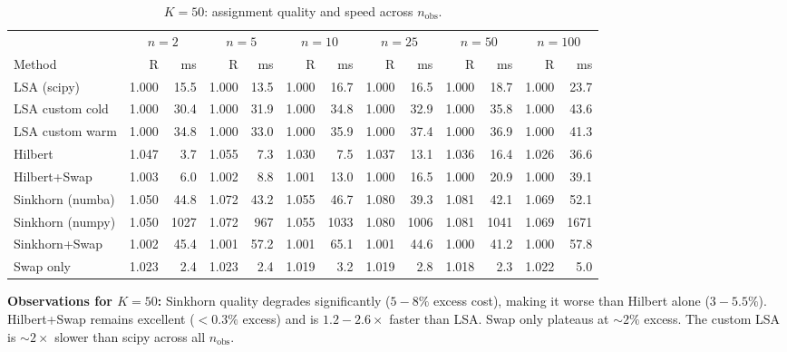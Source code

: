 \documentclass[11pt,a4paper]{article}
\begin{document}
\begin{table}[h!]
\centering
\caption{$K = 50$: assignment quality and speed across $n_{\text{obs}}$.}
\label{tab:K50}
\small
\begin{tabular}{l rrrrrrrrrrrr}
\toprule
& \multicolumn{2}{c}{$n=2$} & \multicolumn{2}{c}{$n=5$} & \multicolumn{2}{c}{$n=10$} & \multicolumn{2}{c}{$n=25$} & \multicolumn{2}{c}{$n=50$} & \multicolumn{2}{c}{$n=100$} \\
\cmidrule(lr){2-3}\cmidrule(lr){4-5}\cmidrule(lr){6-7}\cmidrule(lr){8-9}\cmidrule(lr){10-11}\cmidrule(lr){12-13}
Method & R & ms & R & ms & R & ms & R & ms & R & ms & R & ms \\
\midrule
LSA (scipy)         & 1.000 & 15.5 & 1.000 & 13.5 & 1.000 & 16.7 & 1.000 & 16.5 & 1.000 & 18.7 & 1.000 & 23.7 \\
LSA custom cold     & 1.000 & 30.4 & 1.000 & 31.9 & 1.000 & 34.8 & 1.000 & 32.9 & 1.000 & 35.8 & 1.000 & 43.6 \\
LSA custom warm     & 1.000 & 34.8 & 1.000 & 33.0 & 1.000 & 35.9 & 1.000 & 37.4 & 1.000 & 36.9 & 1.000 & 41.3 \\
Hilbert             & 1.047 & 3.7 & 1.055 & 7.3 & 1.030 & 7.5 & 1.037 & 13.1 & 1.036 & 16.4 & 1.026 & 36.6 \\
Hilbert+Swap        & 1.003 & 6.0 & 1.002 & 8.8 & 1.001 & 13.0 & 1.000 & 16.5 & 1.000 & 20.9 & 1.000 & 39.1 \\
Sinkhorn (numba)    & 1.050 & 44.8 & 1.072 & 43.2 & 1.055 & 46.7 & 1.080 & 39.3 & 1.081 & 42.1 & 1.069 & 52.1 \\
Sinkhorn (numpy)    & 1.050 & 1027 & 1.072 & 967 & 1.055 & 1033 & 1.080 & 1006 & 1.081 & 1041 & 1.069 & 1671 \\
Sinkhorn+Swap       & 1.002 & 45.4 & 1.001 & 57.2 & 1.001 & 65.1 & 1.001 & 44.6 & 1.000 & 41.2 & 1.000 & 57.8 \\
Swap only           & 1.023 & 2.4 & 1.023 & 2.4 & 1.019 & 3.2 & 1.019 & 2.8 & 1.018 & 2.3 & 1.022 & 5.0 \\
\bottomrule
\end{tabular}
\end{table}

\textbf{Observations for $K=50$:} Sinkhorn quality degrades significantly ($5{-}8\%$ excess cost), making it worse than Hilbert alone ($3{-}5.5\%$). Hilbert+Swap remains excellent ($<0.3\%$ excess) and is $1.2{-}2.6\times$ faster than LSA. Swap only plateaus at $\sim 2\%$ excess. The custom LSA is $\sim 2\times$ slower than scipy across all $n_{\text{obs}}$.
\end{document}

